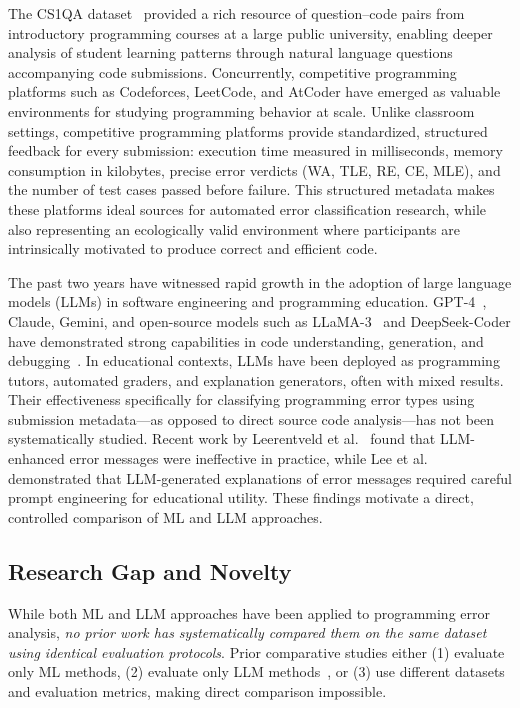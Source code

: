 \documentclass[10pt,a4paper]{article}
\begin{document}
The CS1QA dataset~\cite{lee2022cs1qa} provided a rich resource
of question--code pairs from introductory programming courses at a large
public university, enabling deeper analysis of student learning patterns
through natural language questions accompanying code submissions.
Concurrently, competitive programming platforms such as Codeforces, LeetCode,
and AtCoder have emerged as valuable environments for studying programming
behavior at scale. Unlike classroom settings, competitive programming
platforms provide standardized, structured feedback for every submission:
execution time measured in milliseconds, memory consumption in kilobytes,
precise error verdicts (WA, TLE, RE, CE, MLE), and the number of test cases
passed before failure. This structured metadata makes these platforms ideal
sources for automated error classification research, while also representing
an ecologically valid environment where participants are intrinsically
motivated to produce correct and efficient code.

The past two years have witnessed rapid growth in the adoption of large
language models (LLMs) in software engineering and programming education.
GPT-4~\cite{openai2024gpt4}, Claude, Gemini, and open-source models such as
LLaMA-3~\cite{dubey2024llama} and DeepSeek-Coder have demonstrated strong
capabilities in code understanding, generation, and
debugging~\cite{raihan2025large,zamfirescu2023what,prather2024code,
kazemitabaar2024impact}. In educational contexts, LLMs have been deployed as
programming tutors, automated graders, and explanation generators, often with
mixed results. Their effectiveness specifically for classifying
programming error types using submission metadata---as opposed to direct
source code analysis---has not been systematically studied. Recent work by
Leerentveld et al.~\cite{leerentveld2024not}
found that LLM-enhanced error messages were ineffective in practice,
while Lee et al.~\cite{lee2024code}
demonstrated that LLM-generated explanations of error messages required
careful prompt engineering for educational utility. These findings
motivate a direct, controlled comparison of ML and LLM approaches.

\subsection*{Research Gap and Novelty}

While both ML and LLM approaches have been applied to programming error
analysis, \textit{no prior work has systematically compared them on the same
dataset using identical evaluation protocols}. Prior comparative studies either
(1) evaluate only ML methods,
(2) evaluate only LLM methods~\cite{raihan2025large,zamfirescu2023what},
or (3) use different datasets and evaluation metrics, making direct comparison
impossible.
\end{document}
